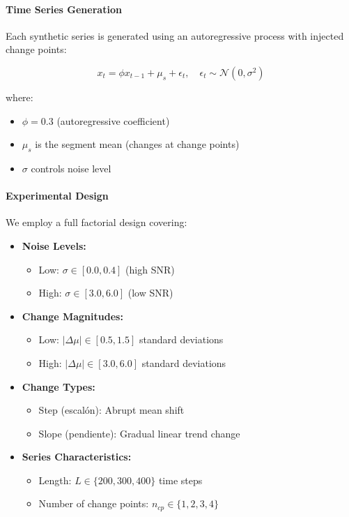 \paragraph{Time Series Generation}

Each synthetic series is generated using an autoregressive process with injected change points:

\begin{equation}
x_t = \phi x_{t-1} + \mu_s + \epsilon_t, \quad \epsilon_t \sim \mathcal{N}(0, \sigma^2)
\end{equation}

where:
\begin{itemize}
    \item $\phi = 0.3$ (autoregressive coefficient)
    \item $\mu_s$ is the segment mean (changes at change points)
    \item $\sigma$ controls noise level
\end{itemize}

\paragraph{Experimental Design}

We employ a full factorial design covering:

\begin{itemize}
    \item \textbf{Noise Levels:} 
    \begin{itemize}
        \item Low: $\sigma \in [0.0, 0.4]$ (high SNR)
        \item High: $\sigma \in [3.0, 6.0]$ (low SNR)
    \end{itemize}
    
    \item \textbf{Change Magnitudes:}
    \begin{itemize}
        \item Low: $|\Delta\mu| \in [0.5, 1.5]$ standard deviations
        \item High: $|\Delta\mu| \in [3.0, 6.0]$ standard deviations
    \end{itemize}
    
    \item \textbf{Change Types:}
    \begin{itemize}
        \item Step (escalón): Abrupt mean shift
        \item Slope (pendiente): Gradual linear trend change
    \end{itemize}
    
    \item \textbf{Series Characteristics:}
    \begin{itemize}
        \item Length: $L \in \{200, 300, 400\}$ time steps
        \item Number of change points: $n_{cp} \in \{1, 2, 3, 4\}$
    \end{itemize}
\end{itemize}

